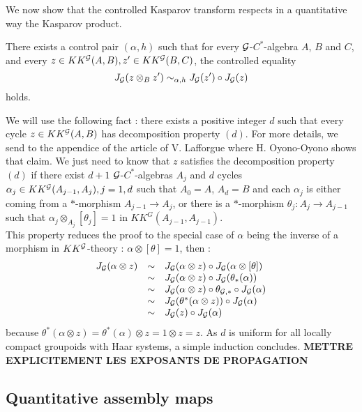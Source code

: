 We now show that the controlled Kasparov transform respects in a quantitative way the Kasparov product.

\begin{prop} There exists a control pair $(\alpha,h)$ such that for every $\mathcal G$-$C^*$-algebra $A$, $B$ and $C$, and every $z\in KK^\mathcal G(A,B),z'\in KK^\mathcal G(B,C)$, the controlled equality
\[J_\mathcal G(z\otimes_B z') \sim_{\alpha,h} J_\mathcal G(z')\circ J_\mathcal G(z)\]
holds.
\end{prop}
\begin{dem}
We will use the following fact : there exists a positive integer $d$ such that every cycle $z\in KK^\mathcal G(A,B)$ has decomposition property $(d)$. For more details, we send to the appendice of the article of V. Lafforgue \cite{LaffOY} where H. Oyono-Oyono shows that claim. We just need to know that $z$ satisfies the decomposition property $(d)$ if there exist $d+1$ $\mathcal G$-$C^*$-algebras $A_j$  and $d$ cycles $\alpha_j\in KK^\mathcal G(A_{j-1},A_j), j=1,d$ such that $A_0=A$, $A_d=B$ and each $\alpha_j$ is either coming from a $*$-morphism $A_{j-1}\rightarrow A_j$, or there is a $*$-morphism $\theta_j: A_j\rightarrow A_{j-1}$ such that $\alpha_j \otimes_{A_j} [\theta_j]=1$ in $KK^G(A_{j-1},A_{j-1})$.\\

This property reduces the proof to the special case of $\alpha$ being the inverse of a morphism in $KK^\mathcal G$-theory : $\alpha\otimes[\theta]=1$, then :
\[\begin{array}{rcl}
J_\mathcal G (\alpha\otimes z) & \sim &  J_\mathcal G(\alpha\otimes z)\circ J_\mathcal G(\alpha\otimes [\theta]) \\
			& \sim & J_\mathcal G(\alpha\otimes z)\circ J_\mathcal G(\theta_*(\alpha))\\
			& \sim & J_\mathcal G(\alpha\otimes z)\circ \theta_{\mathcal G,*}\circ J_\mathcal G(\alpha)\\
			& \sim & J_\mathcal G(\theta^*(\alpha\otimes z))\circ J_\mathcal G(\alpha)\\
			& \sim & J_\mathcal G(z)\circ J_\mathcal G(\alpha) \\
\end{array}\] 
because $\theta^*(\alpha\otimes z)=\theta^*(\alpha)\otimes z=1\otimes z =z$. As $d$ is uniform for all locally compact groupoids with Haar systems, a simple induction concludes. \textbf{METTRE EXPLICITEMENT LES EXPOSANTS DE PROPAGATION}
\end{dem}

\subsection{Quantitative assembly maps}

